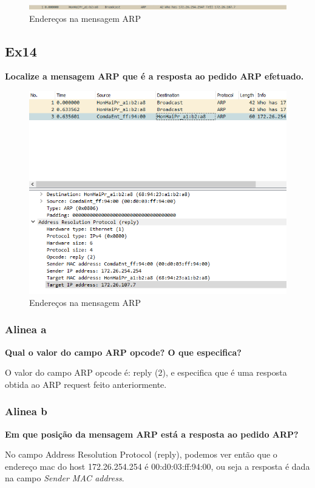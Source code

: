 \documentclass{article}
\begin{document}
\begin{figure}[h]
	\centering
	\includegraphics[scale = 0.54]{ex13.PNG}
	\caption{Endereços na mensagem ARP}
\end{figure}

\subsection{Ex14}
\textbf{Localize a mensagem ARP que é a resposta ao pedido ARP efetuado.}\\\par

\begin{figure}[h]
	\centering
	\includegraphics[scale = 0.6]{ex14.PNG}
	\caption{Endereços na mensagem ARP}
\end{figure}

\subsubsection{Alinea a}
\textbf{Qual o valor do campo ARP opcode? O que especifica?}\\\par
O valor do campo ARP opcode é: reply (2), e especifica que é uma resposta obtida ao ARP request feito anteriormente.

\subsubsection{Alinea b}
\textbf{Em que posição da mensagem ARP está a resposta ao pedido ARP?}\\\par
No campo Address Resolution Protocol (reply), podemos ver então que o endereço mac do host 172.26.254.254 é 00:d0:03:ff:94:00, ou seja a resposta é dada na campo \textit{Sender MAC address}.
\end{document}
